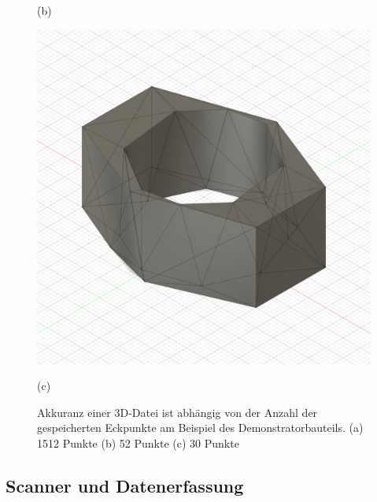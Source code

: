 \begin{figure}[h]
\begin{minipage}{0.32\textwidth}
        \caption*{(b)}
    \end{minipage}\hfill
    \begin{minipage}{0.32\textwidth}
        \centering
        \includegraphics[width=\linewidth]{images/image_demo_low.PNG} %
        \caption*{(c)}
    \end{minipage}\hfill

    \caption{Akkuranz einer 3D-Datei ist abhängig von der Anzahl der gespeicherten
    Eckpunkte am Beispiel des Demonstratorbauteils. (a) 1512 Punkte
    (b) 52 Punkte (c) 30 Punkte}
    \label{fig:3d_design}
\end{figure}

\subsection{Scanner und Datenerfassung}

